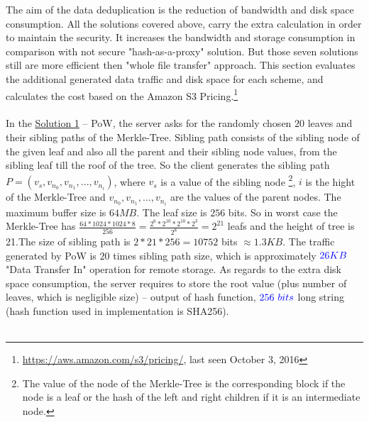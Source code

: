 \documentclass[12pt]{article}
\begin{document}
The aim of the data deduplication is the reduction of bandwidth and disk space consumption. All the solutions covered above, carry the extra calculation in order to maintain the security. It increases  the bandwidth and storage consumption in comparison with not secure "hash-as-a-proxy" solution. But those seven solutions still are more efficient then "whole file transfer" approach. This section evaluates the additional  generated data traffic and disk space for each scheme, and  calculates the cost  based on the Amazon S3 Pricing.\footnote{\url{https://aws.amazon.com/s3/pricing/}, last seen October 3, 2016}\\\\
In the \hyperref[sub:Soltuion1]{Solution 1} -- PoW, the server asks for the  randomly chosen $20$ leaves  and their sibling paths of the Merkle-Tree. Sibling path consists of the sibling node of the given leaf and also all the parent and their sibling node values, from the sibling leaf till the roof of the tree. So the client generates the sibling path $P=(v_s,v_{n_0},v_{n_1},...,v_{n_i})$, where $v_s$ is a value of the sibling node \footnote{The value of the node of the Merkle-Tree is the corresponding block if the node is a leaf or the hash of the left and right children if it is an intermediate node.}, $i$ is the hight of the Merkle-Tree and $v_{n_0},v_{n_1},...,v_{n_i}$ are the values of the parent nodes. The maximum buffer size is $64MB$. The leaf size is $256$ bits. So in worst case the Merkle-Tree has $\frac{64 * 1024* 1024 * 8}{256} = \frac{2^6*2^{10}*2^{10}*2^3}{2^8}=2^{21}$ leafs and the height of tree is 21.The size of sibling path is $2*21*256=10752$ bits  $\approx 1.3 KB$. The traffic generated by PoW is $20$ times sibling path size, which is approximately $\color{blue}26KB$ "Data Transfer In" operation for remote storage. As regards to the extra disk space consumption, the server requires to store the root value (plus number of leaves, which is negligible size) -- output of hash function, $\color{blue}256\ bits$  long string (hash function used in implementation is SHA256).\\\\
\end{document}
